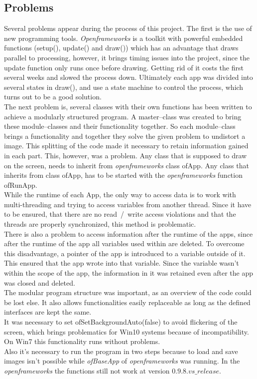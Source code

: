 \documentclass[journal,final,a4paper,twoside]{PS}
\begin{document}
\subsection{Problems}
\label{sec:probs}
Several problems appear during the process of this project.
The first is the use of new programming tools. \emph{Openframeworks} is a toolkit with powerful embedded functions (setup(), update() and draw()) which has an advantage that draws parallel to processing, however, it brings timing issues into the project, since the update function only runs once before drawing. Getting rid of it costs the first several weeks and slowed the process down. Ultimately each app was divided into several states in draw(), and use a state machine to control the process, which turns out to be a good solution.  \\
The next problem is, several classes with their own functions has been written to achieve a modularly structured program. A  master--class was created to bring these module--classes and their functionality together. So each module--class brings a functionality and together they solve the given problem to undistort a image. This splitting of the code made it necessary to retain information gained in each part. This, however, was a problem. Any class that is supposed to draw on the screen, needs to inherit from \emph{openframeworks} class ofApp. Any class that inherits from class ofApp, has to be started with the \emph{openframeworks} function ofRunApp.\\
While the runtime of each App, the only way to access data is to work with multi-threading and trying to access variables from another thread. Since it have to be ensured, that there are no read~/~write access violations and that the threads are properly synchronized, this method is problematic. \\
There is also a problem to access information after the runtime of the apps, since after the runtime of the app all variables used within are deleted. To overcome this disadvantage, a pointer of the app is introduced to a variable outside of it. This ensured that the app wrote into that variable. Since the variable wasn't within the scope of the app, the information in it was retained even after the app was closed and deleted.\\
The modular program structure was important, as an overview of the code could be lost else. It also allows functionalities easily replaceable as long as the defined interfaces are kept the same.
\\
It was necessary to set ofSetBackgroundAuto(false) to avoid flickering of the screen, which brings problematics for Win10 systems because of incompatibility. On Win7 this functionality runs without problems. \\
Also it's necessary to run the program in two steps because to load and save images isn't possible while \emph{ofBaseApp} of \emph{openframeworks} was running. In the \emph{openframeworks} the functions still not work at version $0.9.8.vs\_release$.
\end{document}
